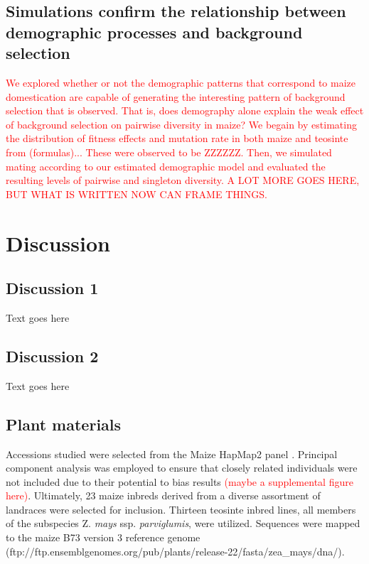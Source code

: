 \documentclass{pnastwo}
\begin{document}
\begin{article}
\subsection{Simulations confirm the relationship between demographic
  processes and background selection}
\textcolor{red}{We explored whether or not the demographic patterns
  that correspond to maize domestication are capable of generating the
  interesting pattern of background selection that is observed. That
  is, does demography alone explain the weak effect of background
  selection on pairwise diversity in maize? We begain by estimating
  the distribution of fitness effects and mutation rate in both maize and teosinte from
  (formulas)... These were observed to be ZZZZZZ. Then, we simulated
  mating according to our estimated demographic model and evaluated
  the resulting levels of pairwise and singleton diversity. A LOT MORE
GOES HERE, BUT WHAT IS WRITTEN NOW CAN FRAME THINGS.}


\section{Discussion}
\subsection{Discussion 1}
Text goes here

\subsection{Discussion 2}
Text goes here

\begin{materials}
\subsection{Plant materials}
Accessions studied were selected from the Maize HapMap2
panel \cite{chia2012} . Principal component analysis was employed to ensure that
closely related individuals were not included due to their potential
to bias results \textcolor{red}{(maybe a supplemental figure here)}. Ultimately, 23 maize inbreds derived from a diverse
assortment of landraces were selected for inclusion. Thirteen teosinte
inbred lines, all members of the subspecies Z. \emph{mays}
ssp. \emph{parviglumis}, were utilized. Sequences were mapped to the
maize B73 version 3 reference genome \cite{schnable2009}
(ftp://ftp.ensemblgenomes.org/pub/plants/release-22/fasta/zea\_mays/dna/).


\end{materials}
\end{article}
\end{document}
